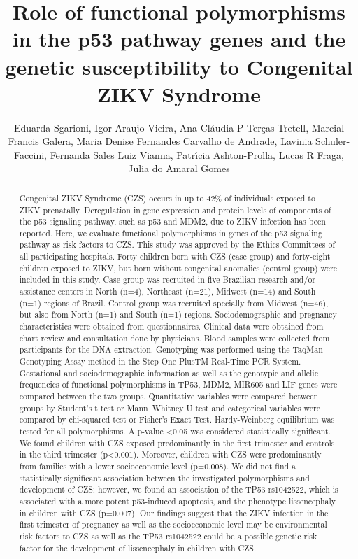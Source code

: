 \documentclass[twoside]{article}
\title{\vspace{-15mm}\fontsize{24pt}{10pt}\selectfont\textbf{ Role of functional polymorphisms in the p53 pathway genes and the genetic susceptibility to Congenital ZIKV Syndrome }} %
\author{ Eduarda Sgarioni,  Igor Araujo Vieira,  Ana Cl\'audia P Ter\c{c}as-Tretell,  Marcial Francis Galera,  Maria Denise Fernandes Carvalho de Andrade,  Lavinia Schuler-Faccini,  Fernanda Sales Luiz Vianna,  Patr\'{\i}cia Ashton-Prolla,  Lucas R Fraga,  Julia do Amaral Gomes }
\affil{ Unichristus - Centro Universit\'ario Christus,  UNIVERSIDADE FEDERAL DO RIO GRANDE DO SUL }
\date{}
\begin{document}
  
  
  \maketitle %
  
  
  \thispagestyle{fancy} %
  
  
  \begin{abstract}
  Congenital ZIKV Syndrome (CZS) occurs in up to 42\% of individuals exposed to ZIKV prenatally. Deregulation in gene expression and protein levels of components of the p53 signaling pathway,  such as p53 and MDM2,  due to ZIKV infection has been reported. Here,  we evaluate functional polymorphisms in genes of the p53 signaling pathway as risk factors to CZS. This study was approved by the Ethics Committees of all participating hospitals. Forty children born with CZS (case group) and forty-eight children exposed to ZIKV,  but born without congenital anomalies (control group) were included in this study. Case group was recruited in five Brazilian research and/or assistance centers in North (n=4),  Northeast (n=21),  Midwest (n=14) and South (n=1) regions of Brazil. Control group was recruited specially from Midwest (n=46),  but also from North (n=1) and South (n=1) regions. Sociodemographic and pregnancy characteristics were obtained from questionnaires. Clinical data were obtained from chart review and consultation done by physicians. Blood samples were collected from participants for the DNA extraction. Genotyping was performed using the TaqMan\textsuperscript{\textcopyright} Genotyping Assay method in the Step One PlusTM Real-Time PCR System. Gestational and sociodemographic information as well as the genotypic and allelic frequencies of functional polymorphisms in TP53,  MDM2,  MIR605 and LIF genes were compared between the two groups. Quantitative variables were compared between groups by Student's t test or Mann–Whitney U test and categorical variables were compared by chi-squared test or Fisher’s Exact Test. Hardy-Weinberg equilibrium was tested for all polymorphisms. A p-value <0.05 was considered statistically significant. We found children with CZS exposed predominantly in the first trimester and controls in the third trimester (p<0.001). Moreover,  children with CZS were predominantly from families with a lower socioeconomic level (p=0.008). We did not find a statistically significant association between the investigated polymorphisms and development of CZS; however,  we found an association of the TP53 rs1042522,  which is associated with a more potent p53-induced apoptosis,  and the phenotype lissencephaly in children with CZS (p=0.007). Our findings suggest that the ZIKV infection in the first trimester of pregnancy as well as the socioeconomic level may be environmental risk factors to CZS as well as the TP53 rs1042522 could be a possible genetic risk factor for the development of lissencephaly in children with CZS.
  

\end{abstract}
\end{document}
